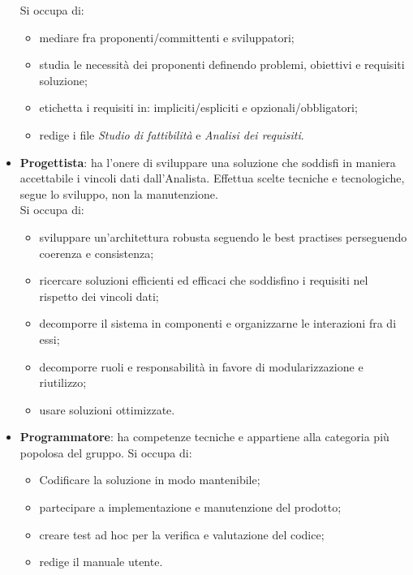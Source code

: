 \begin{itemize}
            Si occupa di:
            \begin{itemize}
                \item mediare fra proponenti/committenti e sviluppatori;
                \item studia le necessità dei proponenti definendo problemi, obiettivi e requisiti soluzione;
                \item etichetta i requisiti in: impliciti/espliciti e opzionali/obbligatori;
                \item redige i file \emph{Studio di fattibilità} e \emph{Analisi dei requisiti}.
            \end{itemize}
            \item \textbf{Progettista}: ha l'onere di sviluppare una soluzione che soddisfi in maniera accettabile i vincoli dati dall'Analista.
            Effettua scelte tecniche e tecnologiche, segue lo sviluppo, non la manutenzione. \\
            Si occupa di:
            \begin{itemize}
                \item sviluppare un'architettura robusta seguendo le best practises perseguendo coerenza e consistenza;
                \item ricercare soluzioni efficienti ed efficaci che soddisfino i requisiti nel rispetto dei vincoli dati;
                \item decomporre il sistema in componenti e organizzarne le interazioni fra di essi;
                \item decomporre ruoli e responsabilità in favore di modularizzazione e riutilizzo;
                \item usare soluzioni ottimizzate.
            \end{itemize}
            \item \textbf{Programmatore}: ha competenze tecniche e appartiene alla categoria pi\`u popolosa del gruppo.
            Si occupa di:
            \begin{itemize}
                \item Codificare la soluzione in modo mantenibile;
                \item partecipare a implementazione e manutenzione del prodotto;
                \item creare test ad hoc per la verifica e valutazione del codice;
                \item redige il manuale utente.
            \end{itemize}

\end{itemize}
